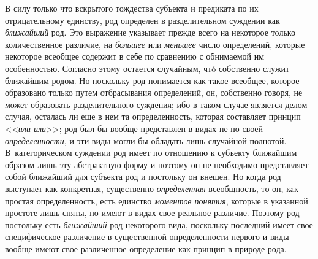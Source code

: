 {В силу только что вскрытого тождества субъекта и предиката по
их отрицательному единству, род определен в разделительном суждении как
{\em ближайший} род. Это
выражение указывает прежде всего на некоторое только количественное
различие, на {\em большее} или {\em меньшее}
число определений, которые некоторое всеобщее содержит в себе
по сравнению с обнимаемой им особенностью. Согласно этому остается
случайным, чтó собственно служит ближайшим родом. Но поскольку род
понимается как такое всеобщее, которое образовано только путем отбрасывания
определений, он, собственно говоря, не может образовать разделительного
суждения; ибо в таком случае является делом случая, осталась ли еще в нем
та определенность, которая составляет принцип <<{\em или-или}>>; род был
бы вообще представлен в видах не по своей {\em определенности}, и
эти виды могли бы обладать лишь случайной полнотой. В~категорическом
суждении род имеет по отношению к субъекту ближайшим образом лишь эту
абстрактную форму и поэтому он не необходимо представляет собой ближайший
для субъекта род и постольку он внешен. Но когда род выступает как
конкретная, существенно {\em определенная}
всеобщность, то он, как простая определенность, есть единство
{\em моментов понятия},
которые в указанной простоте лишь сняты, но
имеют в видах свое реальное различие. Поэтому род постольку есть
{\em ближайший} род
некоторого вида, поскольку последний имеет свое специфическое различение в
существенной определенности первого и виды вообще имеют свое различенное
определение как принцип в природе рода.

}
